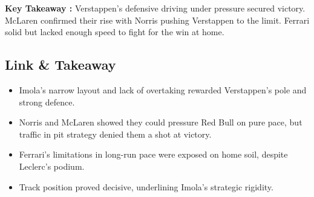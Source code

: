 \textbf{Key Takeaway :}
Verstappen’s defensive driving under pressure secured victory. McLaren confirmed their rise with Norris pushing Verstappen to the limit. Ferrari solid but lacked enough speed to fight for the win at home.


\subsection{Link \& Takeaway}

\begin{itemize}
    \item Imola’s narrow layout and lack of overtaking rewarded Verstappen’s pole and strong defence.  
    \item Norris and McLaren showed they could pressure Red Bull on pure pace, but traffic in pit strategy denied them a shot at victory.
    \item Ferrari’s limitations in long-run pace were exposed on home soil, despite Leclerc’s podium. 
    \item Track position proved decisive, underlining Imola’s strategic rigidity.
\end{itemize}